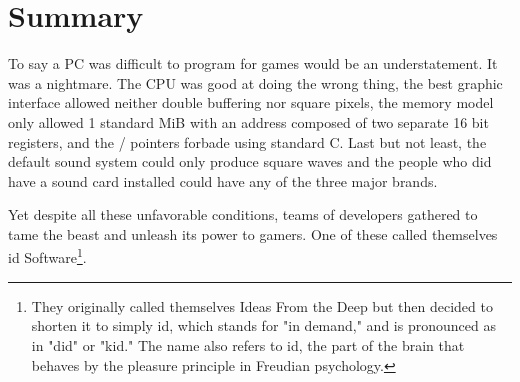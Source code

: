 \documentclass[book.tex]{subfiles}
\begin{document}
\section{Summary}
To say a PC was difficult to program for games would be an understatement. It was a nightmare. The CPU was good at doing the wrong thing, the best graphic interface allowed neither double buffering nor square pixels, the memory model only allowed 1 standard MiB with an address composed of two separate 16 bit registers, and the / pointers forbade using standard C. Last but not least, the default sound system could only produce square waves and the people who did have a sound card installed could have any of the three major brands.\\
\par
Yet despite all these unfavorable conditions, teams of developers gathered to tame the beast and unleash its power to gamers. One of these called themselves id Software\footnote{They originally called themselves Ideas From the Deep but then decided to shorten it to simply id, which stands for "in demand," and is pronounced as in "did" or "kid." The name also refers to id, the part of the brain that behaves by the pleasure principle in Freudian psychology.}.
\end{document}
